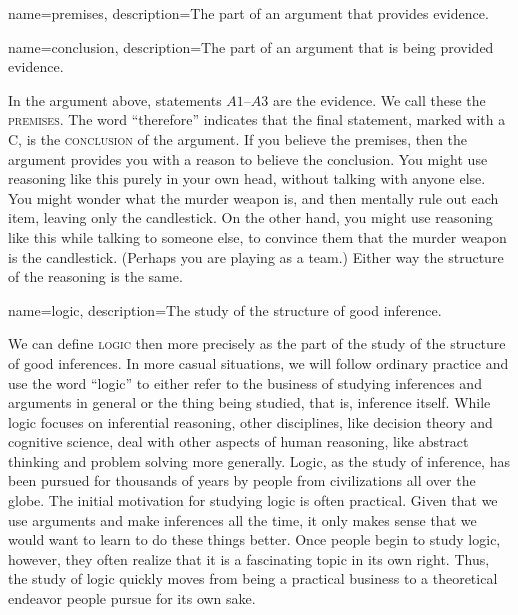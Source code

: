 {
name=premises,
description={The part of an argument that provides evidence.}
}

{
name=conclusion,
description={The part of an argument that is being provided evidence.}
}

In the argument above, statements $A1$--$A3$ are the evidence. We call these the \textsc{\glspl{premise}}\label{def:premise}. The word ``therefore'' indicates that the final statement, marked with a C, is the \textsc{\gls{conclusion}}\label{def:conclusion} of the argument. If you believe the premises, then the argument provides you with a reason to believe the conclusion. You might use reasoning like this purely in your own head, without talking with anyone else. You might wonder what the murder weapon is, and then mentally rule out each item, leaving only the candlestick. On the other hand, you might use reasoning like this while talking to someone else, to convince them that the murder weapon is the candlestick. (Perhaps you are playing as a team.) Either way the structure of the reasoning is the same.

{
name=logic,
description={The study of the structure of good inference.}
}

We can define \textsc{\gls{logic}}\label{def:logic} then more precisely as the part of the study of the structure of good inferences. In more casual situations, we will follow ordinary practice and use the word ``logic'' to either refer to the business of studying inferences and arguments in general or the thing being studied, that is, inference itself. While logic focuses on inferential reasoning, other disciplines, like decision theory and cognitive science, deal with other aspects of human reasoning, like abstract thinking and problem solving more generally. Logic, as the study of inference, has been pursued for thousands of years by people from civilizations all over the globe. The initial motivation for studying logic is often practical. Given that we use arguments and make inferences all the time, it only makes sense that we would want to learn to do these things better.  Once people begin to study logic, however, they often realize that it is a fascinating topic in its own right. Thus, the study of logic quickly moves from being a practical business to a theoretical endeavor people pursue for its own sake.

